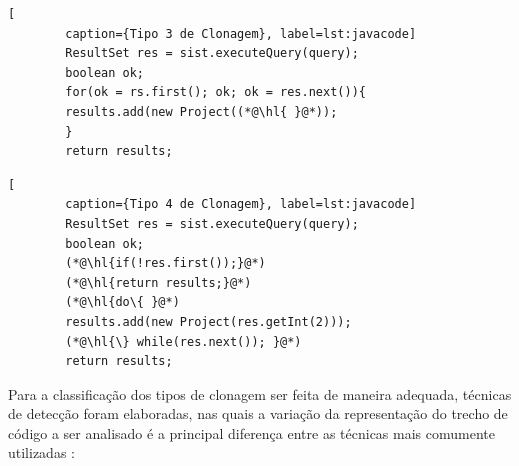 \begin{scriptsize}
	\label{tipo3}
	\estiloJava
	\begin{singlespace}
		\begin{lstlisting}[
		caption={Tipo 3 de Clonagem}, label=lst:javacode]
		ResultSet res = sist.executeQuery(query);
		boolean ok;
		for(ok = rs.first(); ok; ok = res.next()){
		results.add(new Project((*@\hl{ }@*));
		}
		return results;
		\end{lstlisting}
	\end{singlespace}
\end{scriptsize}

\begin{scriptsize}
	\label{tipo4}
	\estiloJava
	\begin{singlespace}
		\begin{lstlisting}[
		caption={Tipo 4 de Clonagem}, label=lst:javacode]
		ResultSet res = sist.executeQuery(query);
		boolean ok;
		(*@\hl{if(!res.first());}@*)
		(*@\hl{return results;}@*)
		(*@\hl{do\{ }@*)
		results.add(new Project(res.getInt(2)));
		(*@\hl{\} while(res.next()); }@*)    
		return results;
		\end{lstlisting}
	\end{singlespace}
\end{scriptsize}

Para a classificação dos tipos de clonagem ser feita de maneira adequada, técnicas de detecção foram elaboradas, nas quais a variação da representação do trecho de código a ser analisado é a principal diferença entre as técnicas mais comumente utilizadas \cite{Rattan2016}\cite{jang2009bitshred}:

